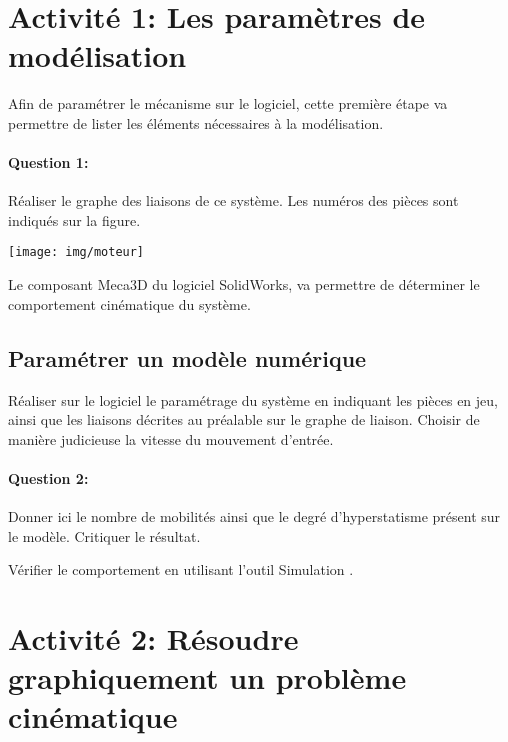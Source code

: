

\section{Activité 1: Les paramètres de modélisation}

\begin{minipage}{0.45\linewidth}
Afin de paramétrer le mécanisme sur le logiciel, cette première étape va permettre de lister les éléments nécessaires à la modélisation.

\paragraph{Question 1:} Réaliser le graphe des liaisons de ce système. Les numéros des pièces sont indiqués sur la figure. 
\end{minipage}
\hfill
\begin{minipage}{0.48\linewidth}
	\texttt{[image: img/moteur]}
\end{minipage}

\vspace{5cm}

Le composant \og Meca3D \fg du logiciel SolidWorks, va permettre de déterminer le comportement cinématique du système.

\subsection{Paramétrer un modèle numérique}

Réaliser sur le logiciel le paramétrage du système en indiquant les pièces en jeu, ainsi que les liaisons décrites au préalable sur le graphe de liaison. Choisir de manière judicieuse la vitesse du mouvement d'entrée.

\paragraph{Question 2:} Donner ici le nombre de mobilités ainsi que le degré d'hyperstatisme présent sur le modèle. Critiquer le résultat.

\reponse[1]

Vérifier le comportement en utilisant l'outil \og Simulation \fg.

\section{Activité 2: Résoudre graphiquement un problème cinématique}

